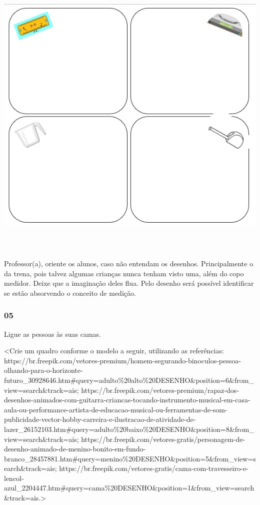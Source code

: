 \includegraphics[width=6.43650in,height=5.62891in]{media/image26.png}

Professor(a), oriente os alunos, caso não entendam os desenhos.
Principalmente o da trena, pois talvez algumas crianças nunca tenham
visto uma, além do copo medidor. Deixe que a imaginação deles flua. Pelo
desenho será possível identificar se estão absorvendo o conceito de
medição.

\subsubsection{05}\label{section-31}

Ligue as pessoas às suas camas.

\textless{}Crie um quadro conforme o modelo a seguir, utilizando as
referências:
https://br.freepik.com/vetores-premium/homem-segurando-binoculos-pessoa-olhando-para-o-horizonte-futuro\_30928646.htm\#query=adulto\%20alto\%20DESENHO\&position=6\&from\_view=search\&track=ais;
https://br.freepik.com/vetores-premium/rapaz-dos-desenhos-animados-com-guitarra-criancas-tocando-instrumento-musical-em-casa-aula-ou-performance-artista-de-educacao-musical-ou-ferramentas-de-som-publicidade-vector-hobby-carreira-e-ilustracao-de-atividade-de-lazer\_26152103.htm\#query=adulto\%20baixo\%20DESENHO\&position=8\&from\_view=search\&track=ais;
https://br.freepik.com/vetores-gratis/personagem-de-desenho-animado-de-menino-bonito-em-fundo-branco\_28457881.htm\#query=menino\%20DESENHO\&position=5\&from\_view=search\&track=ais;
https://br.freepik.com/vetores-gratis/cama-com-travesseiro-e-lencol-azul\_2204447.htm\#query=cama\%20DESENHO\&position=1\&from\_view=search\&track=ais.\textgreater{}

